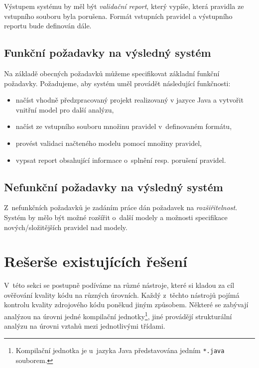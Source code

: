 Výstupem systému by měl být \emph{validační report}, který vypíše, která pravidla ze vstupního souboru byla porušena. Formát vstupních pravidel a výstupního reportu bude definován dále.

\subsection{Funkční požadavky na výsledný systém}

Na základě obecných požadavků můžeme specifikovat základní funkční požadavky. Požadujeme, aby systém uměl provádět následující funkčnosti:
\begin{itemize}
\item načíst vhodně předzpracovaný projekt realizovaný v jazyce Java a vytvořit vnitřní model pro další analýzu,
\item načíst ze vstupního souboru množinu pravidel v~definovaném formátu,
\item provést validaci načteného modelu pomocí množiny pravidel,
\item vypsat report obsahující informace o~splnění resp. porušení pravidel.
\end{itemize}

\subsection{Nefunkční požadavky na výsledný systém}
Z~nefunkčních požadavků je zadáním práce dán požadavek na \emph{rozšiřitelnost}. Systém by mělo být možné rozšířit o~další modely a možnosti specifikace nových/složitějších pravidel nad modely.

\section{Rešerše existujících řešení}
\label{requirements-existing_tools}

V~této sekci se postupně podíváme na různé nástroje, které si kladou za cíl ověřování kvality kódu na různých úrovních. Každý z~těchto nástrojů pojímá kontrolu kvality zdrojového kódu poněkud jiným způsobem. Některé se zabývají  analýzou na úrovni jedné kompilační jednotky\footnote{Kompilační jednotka je u~jazyka Java představována jedním \verb-*.java- souborem.}, jiné provádějí strukturální analýzu na úrovni vztahů mezi jednotlivými třídami.

